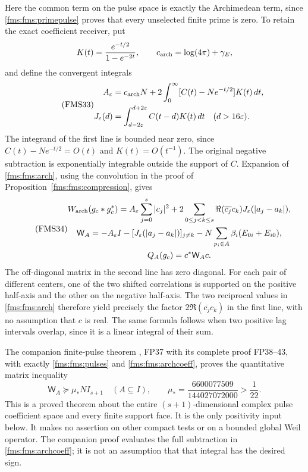 Here the common term on the pulse space is exactly the
Archimedean term, since \eqref{fms:fms:primepulse} proves that every
unselected finite prime is zero. To retain the exact coefficient
receiver, put
\[
 K(t)=\frac{e^{-t/2}}{1-e^{-2t}},\qquad
 c_{\rm arch}=\log(4\pi)+\gamma_E,
\]
and define the convergent integrals
\begin{equation}\tag{FMS33}\label{fms:fms:archcoeff}
 \begin{split}
 A_\varepsilon
 &=c_{\rm arch}N+
       2\int_0^\infty[C(t)-Ne^{-t/2}]K(t)\,dt,\\
 J_\varepsilon(d)
 &=\int_{d-2\varepsilon}^{d+2\varepsilon}
                    C(t-d)K(t)\,dt\quad(d>16\varepsilon).
 \end{split}
\end{equation}
The integrand of the first line is bounded near zero, since
$C(t)-Ne^{-t/2}=O(t)$ and $K(t)=O(t^{-1})$.
The original negative subtraction is exponentially integrable
outside the support of $C$.
Expansion of \eqref{fms:fms:arch}, using the convolution in the proof
of Proposition~\ref{fms:fms:compression}, gives
\begin{equation}\tag{FMS34}\label{fms:fms:facecoeff}
 \begin{gathered}
 W_{\rm arch}(g_c*g_c^*)=
 A_\varepsilon\sum_{j=0}^s|c_j|^2+
       2\sum_{0\le j<k\le s}
            \Re(\overline{c_j}c_k)J_\varepsilon(|a_j-a_k|),\\
 \mathsf W_A=-A_\varepsilon I
       -[J_\varepsilon(|a_j-a_k|)]_{j\ne k}
       -N\sum_{p_i\in A}\beta_i(E_{0i}+E_{i0}),\\
 Q_A(g_c)=c^*\mathsf W_Ac.
 \end{gathered}
\end{equation}
The off-diagonal matrix in the second line has zero diagonal.
For each pair of different centers, one of the two shifted
correlations is supported on the positive half-axis and the other
on the negative half-axis. The two reciprocal values in
\eqref{fms:fms:arch} therefore yield precisely the factor
$2\Re(\overline{c_j}c_k)$ in the first line, with no assumption
that $c$ is real. The same formula follows when two positive
lag intervals overlap, since it is a linear integral of their sum.

The companion finite-pulse theorem \cite{FinitePrimePulse}, FP37 with its complete
proof FP38--43, with exactly
\eqref{fms:fms:pulses} and \eqref{fms:fms:archcoeff}, proves the quantitative
matrix inequality
\begin{equation}\tag{FMS35}\label{fms:fms:finitebound}
 \mathsf W_A\succeq\mu_*NI_{s+1}\quad(A\subseteq I),\qquad
 \mu_*=\frac{6600077509}{144027072000}>\frac1{22}.
\end{equation}
This is a proved theorem about the entire $(s+1)$-dimensional
complex pulse coefficient space and every finite support face.
It is the only positivity input below. It makes no assertion on
other compact tests or on a bounded global Weil operator.
The companion proof evaluates the full subtraction in
\eqref{fms:fms:archcoeff}; it is not an assumption that that integral
has the desired sign.

